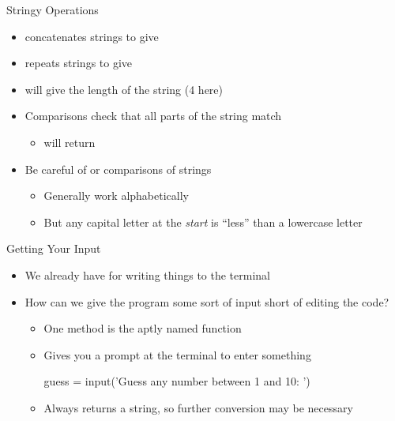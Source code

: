 \documentclass[pdf, aspectratio=169, 12pt]{beamer}
\begin{document}
\begin{frame}{Stringy Operations}
	\begin{itemize}
		\item {} \alert{concatenates} strings to give 
		\item {} \alert{repeats} strings to give 
		\item {} will give the \alert{length} of the string (4 here)
		\item Comparisons check that all parts of the string match
			\begin{itemize}
				\item {} will return 
			\end{itemize}
		\item Be careful of \pyi{<} or \pyi{>} comparisons of strings
			\begin{itemize}
				\item Generally work alphabetically
				\item But any capital letter at the \emph{start} is ``less'' than a lowercase letter
			\end{itemize}
	\end{itemize}
\end{frame}

\begin{frame}[fragile]{Getting Your Input}
	\begin{itemize}
		\item We already have  for writing things to the terminal
		\item How can we give the program some sort of input short of editing the code?
			\begin{itemize}
				\item One method is the aptly named  function
				\item Gives you a \alert{prompt} at the terminal to enter something
					\begin{pythoncode}
						guess = input('Guess any number between 1 and 10: ')
					\end{pythoncode}
				\item Always returns a \alert{string}, so further conversion may be necessary
			\end{itemize}
	\end{itemize}
\end{frame}
\end{document}
